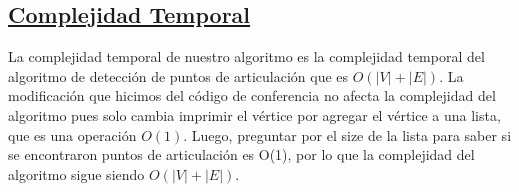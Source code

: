 \documentclass{article}
\begin{document}
    \subsection{\underline{Complejidad Temporal}} 
    La complejidad temporal de nuestro algoritmo es la complejidad temporal del algoritmo de detecci\'on de puntos 
    de articulaci\'on que es $O(|V|+|E|)$. La modificaci\'on que hicimos del c\'odigo de conferencia no afecta la 
    complejidad del algoritmo pues solo cambia imprimir el v\'ertice por agregar el v\'ertice a una lista, que es una
    operaci\'on $O(1)$. Luego, preguntar por el size de la lista para saber si se encontraron puntos de articulaci\'on 
    es O(1), por lo que la complejidad del algoritmo sigue siendo $O(|V|+|E|)$.
    \newline
    
    
\end{document}
